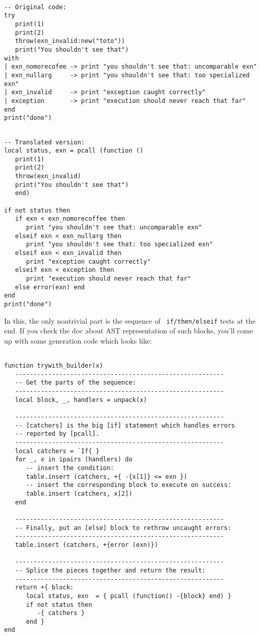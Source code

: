 \begin{Verbatim}[fontsize=\scriptsize]

-- Original code:
try
   print(1)
   print(2)
   throw(exn_invalid:new("toto"))
   print("You shouldn't see that")
with
| exn_nomorecofee -> print "you shouldn't see that: uncomparable exn"
| exn_nullarg     -> print "you shouldn't see that: too specialized exn"
| exn_invalid     -> print "exception caught correctly"
| exception       -> print "execution should never reach that far"
end 
print("done")
\end{Verbatim}

\begin{Verbatim}[fontsize=\scriptsize]

-- Translated version:
local status, exn = pcall (function ()
   print(1)
   print(2)
   throw(exn_invalid)
   print("You shouldn't see that")
   end)

if not status then
   if exn < exn_nomorecoffee then
      print "you shouldn't see that: uncomparable exn"
   elseif exn < exn_nullarg then
      print "you shouldn't see that: too specialized exn"
   elseif exn < exn_invalid then
      print "exception caught correctly"
   elseif exn < exception then
      print "execution should never reach that far"
   else error(exn) end
end 
print("done")
\end{Verbatim}

In this, the only nontrivial part is the sequence of {\tt
  if/then/elseif} tests at the end. If you check the doc about AST
representation of such blocks, you'll come up with some generation
code which looks like:

\pagebreak

\begin{Verbatim}[fontsize=\scriptsize]

function trywith_builder(x)
   ---------------------------------------------------------
   -- Get the parts of the sequence:
   ---------------------------------------------------------
   local block, _, handlers = unpack(x)

   ---------------------------------------------------------
   -- [catchers] is the big [if] statement which handles errors
   -- reported by [pcall].
   ---------------------------------------------------------
   local catchers = `If{ }
   for _, x in ipairs (handlers) do
      -- insert the condition:
      table.insert (catchers, +{ -{x[1]} <= exn })
      -- insert the corresponding block to execute on success:
      table.insert (catchers, x[2])
   end

   ---------------------------------------------------------
   -- Finally, put an [else] block to rethrow uncaught errors:
   ---------------------------------------------------------
   table.insert (catchers, +{error (exn)})

   ---------------------------------------------------------
   -- Splice the pieces together and return the result:
   ---------------------------------------------------------
   return +{ block:
      local status, exn  = { pcall (function() -{block} end) }
      if not status then
         -{ catchers }
      end }
end
\end{Verbatim}

